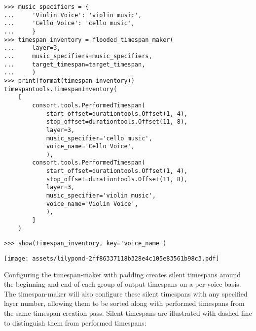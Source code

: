 \begin{abjadbookoutput}
\begin{singlespacing}
\vspace{-0.5\baselineskip}
\begin{verbatim}
>>> music_specifiers = {
...     'Violin Voice': 'violin music',
...     'Cello Voice': 'cello music',
...     }
>>> timespan_inventory = flooded_timespan_maker(
...     layer=3,
...     music_specifiers=music_specifiers,
...     target_timespan=target_timespan,
...     )
>>> print(format(timespan_inventory))
timespantools.TimespanInventory(
    [
        consort.tools.PerformedTimespan(
            start_offset=durationtools.Offset(1, 4),
            stop_offset=durationtools.Offset(11, 8),
            layer=3,
            music_specifier='cello music',
            voice_name='Cello Voice',
            ),
        consort.tools.PerformedTimespan(
            start_offset=durationtools.Offset(1, 4),
            stop_offset=durationtools.Offset(11, 8),
            layer=3,
            music_specifier='violin music',
            voice_name='Violin Voice',
            ),
        ]
    )
\end{verbatim}
\begin{verbatim}
>>> show(timespan_inventory, key='voice_name')
\end{verbatim}
\noindent\texttt{[image: assets/lilypond-2ff86337118b328e4c105e83561b98c3.pdf]}
\end{singlespacing}
\end{abjadbookoutput}

\noindent Configuring the timespan-maker with padding creates silent timespans
around the beginning and end of each group of output timespans on a per-voice
basis. The timespan-maker will also configure these silent timespans with any
specified layer number, allowing them to be sorted along with performed
timespans from the same timespan-creation pass. Silent timespans are
illustrated with dashed line to distinguish them from performed timespans:

\begin{comment}
<abjad>
flooded_timespan_maker = consort.FloodedTimespanMaker(
    padding=Duration(1, 4),
    timespan_specifier=consort.TimespanSpecifier(
        minimum_duration=Duration(1, 8),
        ),
    )
timespan_inventory = flooded_timespan_maker(
    layer=5,
    music_specifiers=music_specifiers,
    target_timespan=target_timespan,
    )
print(format(timespan_inventory))
show(timespan_inventory, key='voice_name')
</abjad>
\end{comment}

